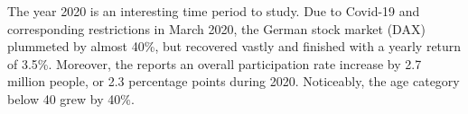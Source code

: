 \documentclass[ProjectABM]{subfiles}
\begin{document}





The year 2020 is an interesting time period to study. Due to Covid-19 and corresponding restrictions in March 2020, the German stock market (DAX) plummeted by almost 40\%, but recovered vastly and finished with a yearly return of 3.5\%. Moreover, the \cite{DAI_2021} reports an overall participation rate increase by 2.7 million people, or 2.3 percentage points during 2020. Noticeably, the age category below 40 grew by 40\%. %
\end{document}
